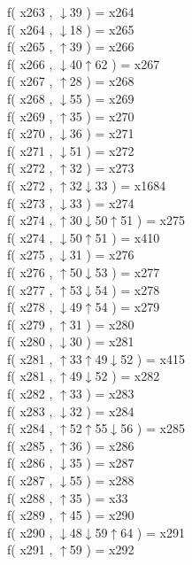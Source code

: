 f( x263 , $\downarrow$39 ) = x264 \\
f( x264 , $\downarrow$18 ) = x265 \\
f( x265 , $\uparrow$39 ) = x266 \\
f( x266 , $\downarrow$40$\uparrow$62 ) = x267 \\
f( x267 , $\uparrow$28 ) = x268 \\
f( x268 , $\downarrow$55 ) = x269 \\
f( x269 , $\uparrow$35 ) = x270 \\
f( x270 , $\downarrow$36 ) = x271 \\
f( x271 , $\downarrow$51 ) = x272 \\
f( x272 , $\uparrow$32 ) = x273 \\
f( x272 , $\uparrow$32$\downarrow$33 ) = x1684 \\
f( x273 , $\downarrow$33 ) = x274 \\
f( x274 , $\uparrow$30$\downarrow$50$\uparrow$51 ) = x275 \\
f( x274 , $\downarrow$50$\uparrow$51 ) = x410 \\
f( x275 , $\downarrow$31 ) = x276 \\
f( x276 , $\uparrow$50$\downarrow$53 ) = x277 \\
f( x277 , $\uparrow$53$\downarrow$54 ) = x278 \\
f( x278 , $\downarrow$49$\uparrow$54 ) = x279 \\
f( x279 , $\uparrow$31 ) = x280 \\
f( x280 , $\downarrow$30 ) = x281 \\
f( x281 , $\uparrow$33$\uparrow$49$\downarrow$52 ) = x415 \\
f( x281 , $\uparrow$49$\downarrow$52 ) = x282 \\
f( x282 , $\uparrow$33 ) = x283 \\
f( x283 , $\downarrow$32 ) = x284 \\
f( x284 , $\uparrow$52$\uparrow$55$\downarrow$56 ) = x285 \\
f( x285 , $\uparrow$36 ) = x286 \\
f( x286 , $\downarrow$35 ) = x287 \\
f( x287 , $\downarrow$55 ) = x288 \\
f( x288 , $\uparrow$35 ) = x33 \\
f( x289 , $\uparrow$45 ) = x290 \\
f( x290 , $\downarrow$48$\downarrow$59$\uparrow$64 ) = x291 \\
f( x291 , $\uparrow$59 ) = x292 \\
